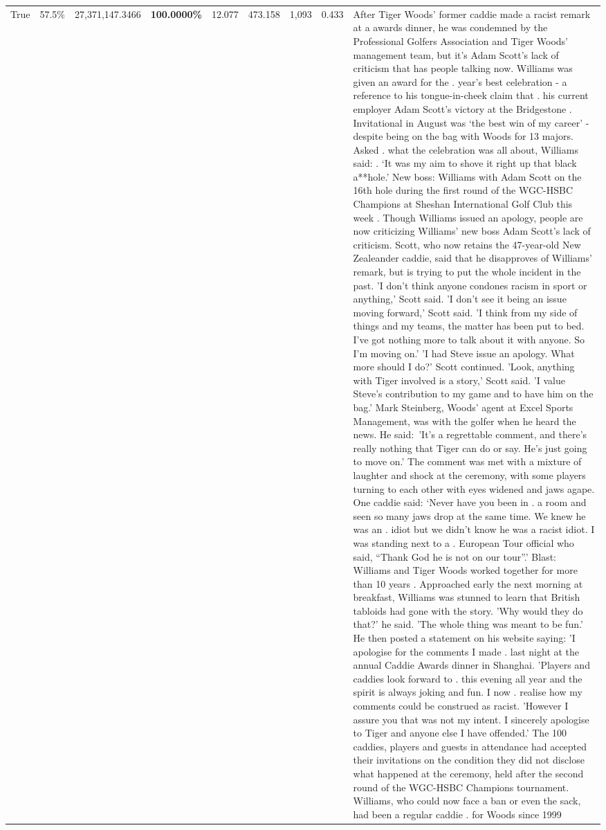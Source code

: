 \begin{table}[H]
\begin{tabular}{lllrlllll}
True & 57.5\% & 27,371,147.3466 & \bfseries \color{red} 100.0000\% & 12.077 & 473.158 & 1,093 & 0.433 & After Tiger Woods' former caddie made a racist remark at a awards dinner, he was condemned by the Professional Golfers Association and Tiger Woods' management team, but it's Adam Scott's lack of criticism that has people talking now. Williams was given an award for the . year’s best celebration - a reference to his tongue-in-cheek claim that . his current employer Adam Scott’s victory at the Bridgestone . Invitational in August was ‘the best win of my career’ - despite being on the bag with Woods for 13 majors. Asked . what the celebration was all about, Williams said: . ‘It was my aim to shove it right up that black a**hole.’ New boss: Williams with Adam Scott  on the 16th hole during the first round of the WGC-HSBC Champions at Sheshan International Golf Club this week . Though Williams issued an apology, people are now criticizing Williams' new boss Adam Scott's lack of criticism. Scott, who now retains the 47-year-old New Zealeander caddie, said that he disapproves of Williams' remark, but is trying to put the whole incident in the past. 'I don't think anyone condones racism in sport or anything,' Scott said. 'I don't see it being an issue moving forward,' Scott said. 'I think from my side of things and my teams, the matter has been put to bed. I've got nothing more to talk about it with anyone. So I'm moving on.' 'I had Steve issue an apology. What more should I do?' Scott continued. 'Look, anything with Tiger involved is a story,' Scott said. 'I value Steve's contribution to my game and to have him on the bag.' Mark Steinberg, Woods' agent at Excel Sports Management, was with the golfer when he heard the news. He said: 'It's a regrettable comment, and there's really nothing that Tiger can do or say. He's just going to move on.' The comment was met with a mixture of laughter and shock at the ceremony, with some players turning to each other with eyes widened and jaws agape. One caddie said: ‘Never have you been in . a room and seen so many jaws drop at the same time. We knew he was an . idiot but we didn’t know he was a racist idiot. I was standing next to a . European Tour official who said, “Thank God he is not on our tour”.’ Blast: Williams and Tiger Woods worked together for more than 10 years . Approached early the next morning at breakfast, Williams was stunned to learn that British tabloids had gone with the story. 'Why would they do that?' he said. 'The whole thing was meant to be fun.' He then posted a statement on his website saying: 'I apologise for the comments I made . last night at the annual Caddie Awards dinner in Shanghai. 'Players and caddies look forward to . this evening all year and the spirit is always joking and fun. I now . realise how my comments could be construed as racist. 'However I assure you that was not my intent. I sincerely apologise to Tiger and anyone else I have offended.' The 100 caddies, players and guests in attendance had accepted their invitations on the condition they did not disclose what happened at the ceremony, held after the second round of the WGC-HSBC Champions tournament. Williams, who could now face a ban or even the sack, had been a regular caddie . for Woods since 1999 
\end{tabular}
\end{table}
